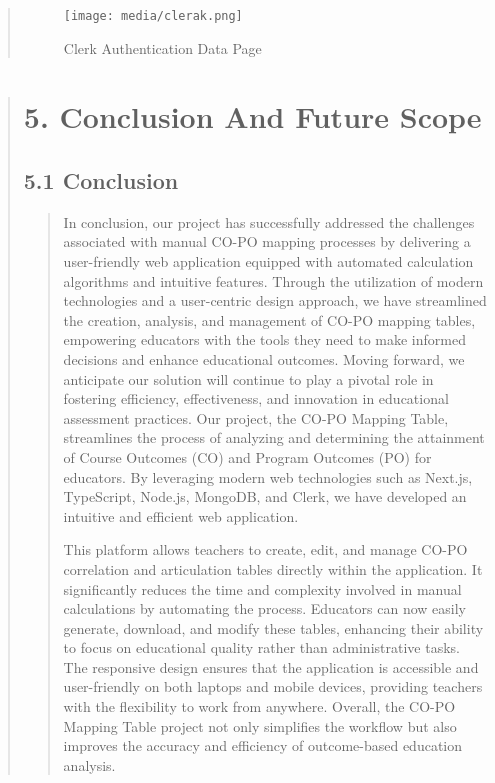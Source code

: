 \documentclass[12pt]{report}
\begin{document}
\begin{quote}
		\begin{figure}[h]
			\centering
			\texttt{[image: media/clerak.png]}\\
			\caption{Clerk Authentication Data Page}
			\vspace{0.5cm}
		\end{figure}
		
	\end{quote}
	\clearpage
	
	
	
	
	
	\clearpage
	
	
	\begin{quote}
		\section{ 5. Conclusion And Future Scope}
		\subsection{5.1 Conclusion}
		\begin{quote}
			In conclusion, our project has successfully addressed the challenges associated with manual CO-PO mapping processes by delivering a user-friendly web application equipped with automated calculation algorithms and intuitive features. Through the utilization of modern technologies and a user-centric design approach, we have streamlined the creation, analysis, and management of CO-PO mapping tables, empowering educators with the tools they need to make informed decisions and enhance educational outcomes. Moving forward, we anticipate our solution will continue to play a pivotal role in fostering efficiency, effectiveness, and innovation in educational assessment practices.
			Our project, the CO-PO Mapping Table, streamlines the process of analyzing and determining the attainment of Course Outcomes (CO) and Program Outcomes (PO) for educators. By leveraging modern web technologies such as Next.js, TypeScript, Node.js, MongoDB, and Clerk, we have developed an intuitive and efficient web application.
			
			This platform allows teachers to create, edit, and manage CO-PO correlation and articulation tables directly within the application. It significantly reduces the time and complexity involved in manual calculations by automating the process. Educators can now easily generate, download, and modify these tables, enhancing their ability to focus on educational quality rather than administrative tasks.
			The responsive design ensures that the application is accessible and user-friendly on both laptops and mobile devices, providing teachers with the flexibility to work from anywhere. Overall, the CO-PO Mapping Table project not only simplifies the workflow but also improves the accuracy and efficiency of outcome-based education analysis.
			

\end{quote}
\end{quote}
\end{document}

